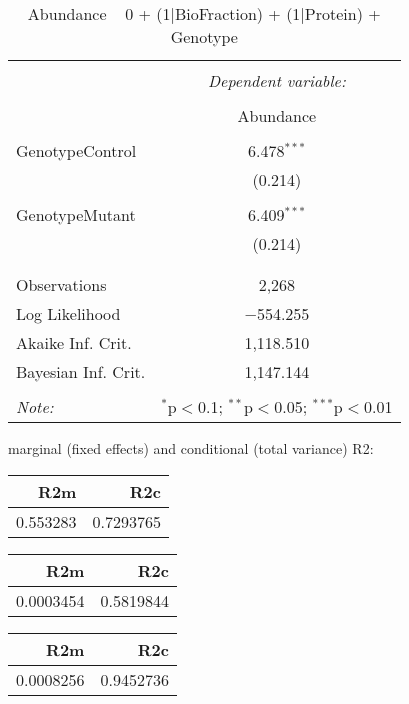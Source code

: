 \documentclass[11pt]{report}
\begin{document}
\begin{table}[!htbp] \centering 
  \caption{Abundance ~ 0 + (1|BioFraction) + (1|Protein) + Genotype} 
  \label{} 
\begin{tabular}{@{\extracolsep{5pt}}lc} 
\\[-1.8ex]\hline 
\hline \\[-1.8ex] 
 & \multicolumn{1}{c}{\textit{Dependent variable:}} \\ 
\cline{2-2} 
\\[-1.8ex] & Abundance \\ 
\hline \\[-1.8ex] 
 GenotypeControl & 6.478$^{***}$ \\ 
  & (0.214) \\ 
  & \\ 
 GenotypeMutant & 6.409$^{***}$ \\ 
  & (0.214) \\ 
  & \\ 
\hline \\[-1.8ex] 
Observations & 2,268 \\ 
Log Likelihood & $-$554.255 \\ 
Akaike Inf. Crit. & 1,118.510 \\ 
Bayesian Inf. Crit. & 1,147.144 \\ 
\hline 
\hline \\[-1.8ex] 
\textit{Note:}  & \multicolumn{1}{r}{$^{*}$p$<$0.1; $^{**}$p$<$0.05; $^{***}$p$<$0.01} \\ 
\end{tabular} 
\end{table} 
marginal (fixed effects) and conditional (total variance) R2:

\begin{tabular}{r|r}
\hline
R2m & R2c\\
\hline
0.553283 & 0.7293765\\
\hline
\end{tabular}

\begin{tabular}{r|r}
\hline
R2m & R2c\\
\hline
0.0003454 & 0.5819844\\
\hline
\end{tabular}

\begin{tabular}{r|r}
\hline
R2m & R2c\\
\hline
0.0008256 & 0.9452736\\
\hline
\end{tabular}
\end{document}
